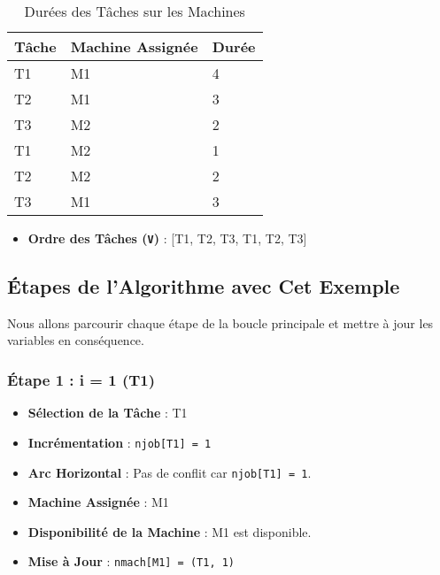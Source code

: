 \documentclass[12pt]{article}
\begin{document}
\begin{table}[h!]
\centering
\begin{tabular}{@{}lll@{}}
\toprule
\textbf{Tâche} & \textbf{Machine Assignée} & \textbf{Durée} \\ \midrule
T1            & M1                        & 4               \\
T2            & M1                        & 3               \\
T3            & M2                        & 2               \\
T1            & M2                        & 1               \\
T2            & M2                        & 2               \\
T3            & M1                        & 3               \\ \bottomrule
\end{tabular}
\caption{Durées des Tâches sur les Machines}
\end{table}

\begin{itemize}
    \item \textbf{Ordre des Tâches (\texttt{V})} : [T1, T2, T3, T1, T2, T3]
\end{itemize}

\subsection{Étapes de l'Algorithme avec Cet Exemple}

Nous allons parcourir chaque étape de la boucle principale et mettre à jour les variables en conséquence.

\subsubsection{Étape 1 : i = 1 (T1)}

\begin{itemize}
    \item \textbf{Sélection de la Tâche} : T1
    \item \textbf{Incrémentation} : \texttt{njob[T1] = 1}
    \item \textbf{Arc Horizontal} : Pas de conflit car \texttt{njob[T1] = 1}.
    \item \textbf{Machine Assignée} : M1
    \item \textbf{Disponibilité de la Machine} : M1 est disponible.
    \item \textbf{Mise à Jour} : \texttt{nmach[M1] = (T1, 1)}
\end{itemize}
\end{document}
